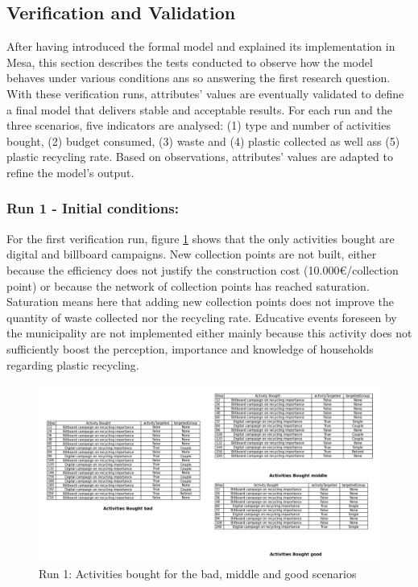 \newpage 

\subsection{Verification and Validation}
\noindent After having introduced the formal model and explained its implementation in Mesa, this section describes the tests conducted to observe how the model behaves under various conditions ans so answering the first research question. With these verification runs, attributes' values are eventually validated to define a final model that delivers stable and acceptable results. For each run and the three scenarios, five indicators are analysed: (1) type and number of activities bought, (2) budget consumed, (3) waste and (4) plastic collected as well ass (5) plastic recycling rate. Based on observations, attributes' values are adapted to refine the model's output.\\

\subsubsection{Run 1 - Initial conditions:}
For the first verification run, figure \ref{fig:Run 1 activities} shows that the only activities bought are digital and billboard campaigns. New collection points are not built, either because the efficiency does not justify the construction cost (10.000€/collection point) or because the network of collection points has reached saturation. Saturation means here that adding new collection points does not improve the quantity of waste collected nor the recycling rate. Educative events foreseen by the municipality are not implemented either mainly because this activity does not sufficiently boost the perception, importance and knowledge of households regarding plastic recycling. 


\begin{figure}[H] 
    \centering
        \captionsetup{width=\linewidth}
        \includegraphics[width=1.0\linewidth]{Images/Run 1 Activities.png}
        \caption{Run 1: Activities bought for the bad, middle and good scenarios}
    \label{fig:Run 1 activities}
\end{figure}\\

